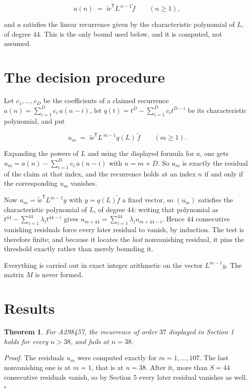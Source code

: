 \documentclass[11pt]{article}
\newtheorem{theorem}{Theorem}
\theoremstyle{definition}
\begin{document}
\[a(n) \;=\; \tilde w^{\mathsf T} L^{\,n-1} \tilde f \qquad (n \ge 1),\]

and $a$ satisfies the linear recurrence given by the characteristic polynomial of $L$, of degree $44$. This is the only bound used below, and it is computed, not assumed.

\section{The decision procedure}

Let $c_1,\dots,c_D$ be the coefficients of a claimed recurrence $a(n) = \sum_{i=1}^{D} c_i\,a(n-i)$, let $q(t) = t^{D} - \sum_{i=1}^{D} c_i t^{D-i}$ be its characteristic polynomial, and put

\[u_m \;=\; \tilde w^{\mathsf T} L^{\,m-1} q(L)\,\tilde f \qquad (m \ge 1).\]

Expanding the powers of $L$ and using the displayed formula for $a$, one gets $u_m = a(n) - \sum_{i=1}^{D} c_i\,a(n-i)$ with $n = m + D$. So $u_m$ is exactly the residual of the claim at that index, and the recurrence holds at an index $n$ if and only if the corresponding $u_m$ vanishes.

Now $u_m = \tilde w^{\mathsf T} L^{m-1} y$ with $y = q(L)\tilde f$ a fixed vector, so $(u_m)$ satisfies the characteristic polynomial of $L$, of degree $44$: writing that polynomial as $t^{44} - \sum_{i=1}^{44} \lambda_i t^{44-i}$ gives $u_{m+44} = \sum_{i=1}^{44} \lambda_i u_{m+44-i}$. Hence $44$ consecutive vanishing residuals force every later residual to vanish, by induction. The test is therefore finite; and because it locates the {\itshape last} nonvanishing residual, it pins the threshold exactly rather than merely bounding it.

Everything is carried out in exact integer arithmetic on the vector $L^{m-1}y$. The matrix $M$ is never formed.

\section{Results}

\begin{theorem} For A298457, the recurrence of order $37$ displayed in Section 1 holds for every $n > 38$, and fails at $n = 38$.\end{theorem}

{\itshape Proof.} The residuals $u_m$ were computed exactly for $m = 1,\dots,107$. The last nonvanishing one is at $m = 1$, that is at $n = 38$. After it, more than $S = 44$ consecutive residuals vanish, so by Section 5 every later residual vanishes as well. $\square$
\end{document}
